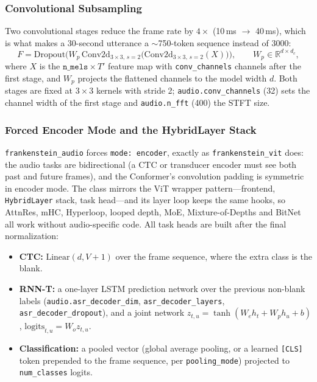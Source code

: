 \subsubsection{Convolutional Subsampling}

Two convolutional stages reduce the frame rate by $4\times$ (10\,ms $\to$ 40\,ms), which is what makes a 30-second utterance a $\sim$750-token sequence instead of 3000:
\begin{equation}
F = \mathrm{Dropout}\Big(W_p\,\mathrm{Conv2d}_{3\times3,\,s=2}\big(\mathrm{Conv2d}_{3\times3,\,s=2}(X)\big)\Big),
\qquad W_p \in \mathbb{R}^{d \times d_c},
\label{eq:audio-subsampling}
\end{equation}
where $X$ is the $\texttt{n\_mels} \times T'$ feature map with \texttt{conv\_channels} channels after the first stage, and $W_p$ projects the flattened channels to the model width $d$. Both stages are fixed at $3\times3$ kernels with stride 2; \texttt{audio.conv\_channels} (32) sets the channel width of the first stage and \texttt{audio.n\_fft} (400) the STFT size.

\subsubsection{Forced Encoder Mode and the HybridLayer Stack}

\texttt{frankenstein\_audio} forces \texttt{mode: encoder}, exactly as \texttt{frankenstein\_vit} does: the audio tasks are bidirectional (a CTC or transducer encoder must see both past and future frames), and the Conformer's convolution padding is symmetric in encoder mode. The class mirrors the ViT wrapper pattern---frontend, \texttt{HybridLayer} stack, task head---and its layer loop keeps the same hooks, so AttnRes, mHC, Hyperloop, looped depth, MoE, Mixture-of-Depths and BitNet all work without audio-specific code. All task heads are built after the final normalization:

\begin{itemize}[leftmargin=*]
    \item \textbf{CTC:} $\mathrm{Linear}(d, V+1)$ over the frame sequence, where the extra class is the blank.
    \item \textbf{RNN-T:} a one-layer LSTM prediction network over the previous non-blank labels (\texttt{audio.asr\_decoder\_dim}, \texttt{asr\_decoder\_layers}, \texttt{asr\_decoder\_dropout}), and a joint network $z_{t,u} = \tanh(W_e h_t + W_p h_u + b)$, $\mathrm{logits}_{t,u} = W_o z_{t,u}$.
    \item \textbf{Classification:} a pooled vector (global average pooling, or a learned \texttt{[CLS]} token prepended to the frame sequence, per \texttt{pooling\_mode}) projected to \texttt{num\_classes} logits.
\end{itemize}

